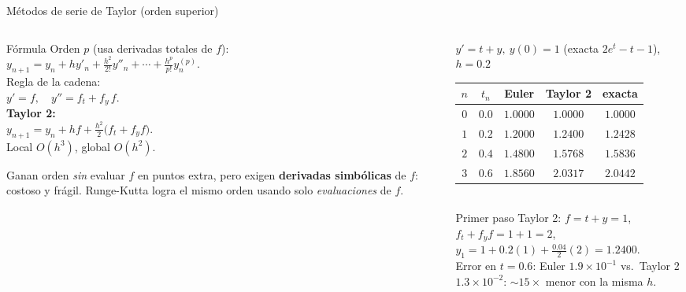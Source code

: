 \documentclass[aspectratio=169,10pt]{beamer}
\begin{document}
\begin{frame}{Métodos de serie de Taylor (orden superior)}
\begin{columns}[T]
\begin{column}{0.46\textwidth}
\begin{cardidea}{Fórmula}{\faSuperscript}
{\footnotesize Orden $p$ (usa derivadas totales de $f$):\\[0.2mm]
$y_{n+1}=y_n+hy'_n+\tfrac{h^2}{2!}y''_n+\cdots+\tfrac{h^p}{p!}y_n^{(p)}$.\\[0.9mm]
Regla de la cadena:\\[0.2mm]
$y'=f,\quad y''=f_t+f_y\,f$.\\[0.9mm]
\textbf{Taylor 2:}\\[0.2mm]
$y_{n+1}=y_n+hf+\tfrac{h^2}{2}\big(f_t+f_y f\big)$.\\[0.4mm]
Local $O(h^3)$, global $O(h^2)$.}
\end{cardidea}
\vspace{1mm}
\begin{cardnota}[\faInfoCircle]
{\footnotesize Ganan orden \emph{sin} evaluar $f$ en puntos extra, pero exigen \textbf{derivadas simbólicas} de $f$: costoso y frágil. Runge-Kutta logra el mismo orden usando solo \emph{evaluaciones} de $f$.}
\end{cardnota}
\end{column}
\begin{column}{0.52\textwidth}
\begin{cardgear}{$y'=t+y,\ y(0)=1$ (exacta $2e^{t}-t-1$), $h=0.2$}{\faTable}
\centering
{\footnotesize\renewcommand{\arraystretch}{1.3}\setlength{\tabcolsep}{6pt}
\begin{tabular}{c|c|c|c|c}
$n$ & $t_n$ & Euler & Taylor 2 & exacta\\\hline
$0$ & $0.0$ & $1.0000$ & $1.0000$ & $1.0000$\\
$1$ & $0.2$ & $1.2000$ & $1.2400$ & $1.2428$\\
$2$ & $0.4$ & $1.4800$ & $1.5768$ & $1.5836$\\
$3$ & $0.6$ & $1.8560$ & $2.0317$ & $2.0442$\\
\end{tabular}}\\[1.2mm]
{\footnotesize Primer paso Taylor 2: $f=t+y=1$, $f_t+f_yf=1+1=2$,\\[0.2mm]
$y_1=1+0.2(1)+\tfrac{0.04}{2}(2)=1.2400$.\\[0.6mm]
Error en $t{=}0.6$: Euler $1.9{\times}10^{-1}$ vs.\ Taylor 2 $1.3{\times}10^{-2}$: $\sim15\times$ menor con la misma $h$.}
\end{cardgear}
\end{column}
\end{columns}
\end{frame}
\end{document}
